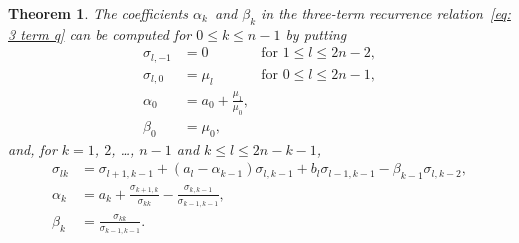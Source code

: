 \documentclass[12pt,a4paper]{article}
\newtheorem{theorem}{Theorem}
\begin{document}
\begin{theorem}
The coefficients $\alpha_k$~and $\beta_k$ in the three-term 
recurrence relation~\eqref{eq: 3 term q} can be computed 
for $0\le k\le n-1$ by putting
\[
\begin{aligned}
\sigma_{l,-1}&=0&\text{for $1\le l\le 2n-2$},\\
\sigma_{l,0}&=\mu_l&\text{for $0\le l\le2n-1$},\\
\alpha_0&=a_0+\frac{\mu_1}{\mu_0},\\
\beta_0&=\mu_0,
\end{aligned} 
\]
and, for $k=1$, $2$, \dots, $n-1$ and $k\le l\le2n-k-1$, 
\[
\begin{aligned}
\sigma_{lk}&=\sigma_{l+1,k-1}+(a_l-\alpha_{k-1})\sigma_{l,k-1}
		+b_l\sigma_{l-1,k-1}-\beta_{k-1}\sigma_{l,k-2},\\
\alpha_k&=a_k+\frac{\sigma_{k+1,k}}{\sigma_{kk}}
	-\frac{\sigma_{k,k-1}}{\sigma_{k-1,k-1}},\\
\beta_k&=\frac{\sigma_{kk}}{\sigma_{k-1,k-1}}.
\end{aligned}
\]
\end{theorem}
\end{document}
